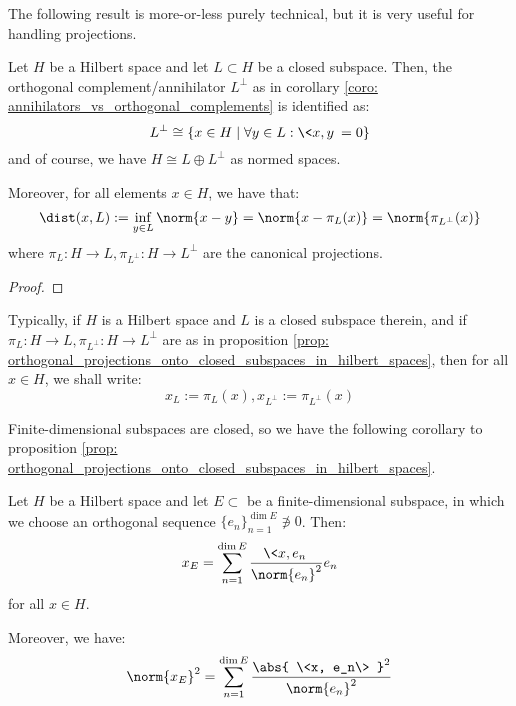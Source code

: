         The following result is more-or-less purely technical, but it is very useful for handling projections.
        \begin{proposition} \label{prop: orthogonal_projections_onto_closed_subspaces_in_hilbert_spaces}
            Let $H$ be a Hilbert space and let $L \subset H$ be a closed subspace. Then, the orthogonal complement/annihilator $L^{\perp}$ as in corollary \ref{coro: annihilators_vs_orthogonal_complements} is identified as:
                $$L^{\perp} \cong \{ x \in H \mid \forall y \in L: \<x, y\> = 0 \}$$
            and of course, we have $H \cong L \oplus L^{\perp}$ as normed spaces.

            Moreover, for all elements $x \in H$, we have that:
                $$\dist(x, L) := \inf_{y \in L} \norm{x - y} = \norm{x - \pi_L(x)} = \norm{\pi_{L^{\perp}}(x)}$$
            where $\pi_L: H \to L, \pi_{L^{\perp}}: H \to L^{\perp}$ are the canonical projections.
        \end{proposition}
            \begin{proof}
            \end{proof}
        \begin{convention}
            Typically, if $H$ is a Hilbert space and $L$ is a closed subspace therein, and if $\pi_L: H \to L, \pi_{L^{\perp}}: H \to L^{\perp}$ are as in proposition \ref{prop: orthogonal_projections_onto_closed_subspaces_in_hilbert_spaces}, then for all $x \in H$, we shall write:
                $$x_L := \pi_L(x), x_{L^{\perp}} := \pi_{L^{\perp}}(x)$$
        \end{convention}
        Finite-dimensional subspaces are closed, so we have the following corollary to proposition \ref{prop: orthogonal_projections_onto_closed_subspaces_in_hilbert_spaces}.
        \begin{corollary} \label{coro: orthogonal_projections_onto_finite_dimensional_subspaces_in_hilbert_spaces}
            Let $H$ be a Hilbert space and let $E \subset $ be a finite-dimensional subspace, in which we choose an orthogonal sequence $\{e_n\}_{n = 1}^{\dim E} \not \ni 0$. Then:
                $$x_E = \sum_{n = 1}^{\dim E} \frac{\<x, e_n\>}{\norm{e_n}^2} e_n$$
            for all $x \in H$.

            Moreover, we have:
                $$\norm{x_E}^2 = \sum_{n = 1}^{\dim E} \frac{ \abs{ \<x, e_n\> }^2 }{\norm{e_n}^2}$$
        \end{corollary}
